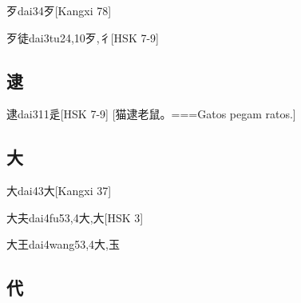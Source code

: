 \begin{EntryWithPhonetic}{歹}{dai3}{4}{⽍}[Kangxi 78]
\end{EntryWithPhonetic}

\begin{EntryWithPhonetic}{歹徒}{dai3tu2}{4,10}{⽍,⼻}[HSK 7-9]
\end{EntryWithPhonetic}

\subsection*{逮}

\begin{EntryWithPhonetic}{逮}{dai3}{11}{⾡}[HSK 7-9]
  [猫逮老鼠。===Gatos pegam ratos.]
\end{EntryWithPhonetic}

\subsection*{大}

\begin{EntryWithPhonetic}{大}{dai4}{3}{⼤}[Kangxi 37]
\end{EntryWithPhonetic}

\begin{EntryWithPhonetic}{大夫}{dai4fu5}{3,4}{⼤,⼤}[HSK 3]
\end{EntryWithPhonetic}

\begin{EntryWithPhonetic}{大王}{dai4wang5}{3,4}{⼤,⽟}
\end{EntryWithPhonetic}

\subsection*{代}

